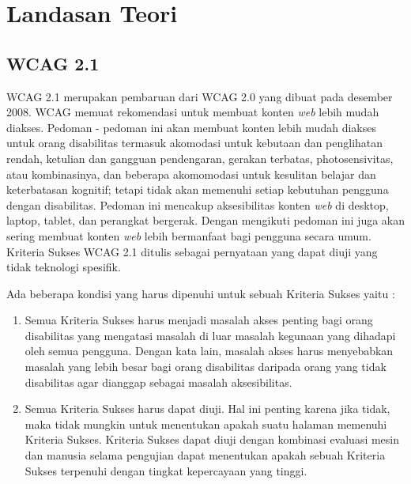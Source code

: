 \chapter{Landasan Teori}
\label{chap:teori}


\section{WCAG 2.1}
\label{sec:WCAG2.1} 
WCAG 2.1 merupakan pembaruan dari WCAG 2.0 yang dibuat pada desember 2008. WCAG memuat rekomendasi untuk membuat konten \textit{web} lebih mudah diakses. Pedoman - pedoman ini akan membuat konten lebih mudah diakses untuk orang disabilitas termasuk akomodasi untuk kebutaan dan penglihatan rendah, ketulian dan gangguan pendengaran, gerakan terbatas, photosensivitas, atau kombinasinya, dan beberapa akomomodasi untuk kesulitan belajar dan keterbatasan kognitif; tetapi tidak akan memenuhi setiap kebutuhan pengguna dengan disabilitas. Pedoman ini mencakup aksesibilitas konten \textit{web} di desktop, laptop, tablet, dan perangkat bergerak. Dengan mengikuti pedoman ini juga akan sering membuat konten \textit{web} lebih bermanfaat bagi pengguna secara umum. Kriteria Sukses WCAG 2.1 ditulis sebagai pernyataan yang dapat diuji yang tidak teknologi spesifik.

Ada beberapa kondisi yang harus dipenuhi untuk sebuah Kriteria Sukses yaitu :
\begin{enumerate}
	\item Semua Kriteria Sukses harus menjadi masalah akses penting bagi orang disabilitas yang mengatasi masalah di luar masalah kegunaan yang dihadapi oleh semua pengguna. Dengan kata lain, masalah akses harus menyebabkan masalah yang lebih besar bagi orang disabilitas daripada orang yang tidak disabilitas agar dianggap sebagai masalah aksesibilitas.
	\item Semua Kriteria Sukses harus dapat diuji. Hal ini penting karena jika tidak, maka tidak mungkin untuk menentukan apakah suatu halaman memenuhi Kriteria Sukses. Kriteria Sukses dapat diuji dengan kombinasi evaluasi mesin dan manusia selama pengujian dapat menentukan apakah sebuah Kriteria Sukses terpenuhi dengan tingkat kepercayaan yang tinggi.
\end{enumerate}


